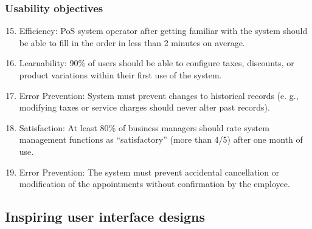 \documentclass{article}
\begin{document}
\subsubsection{Usability objectives}
\begin{enumerate}[label=UO\arabic*.]
\setcounter{enumi}{14}
    \item Efficiency: PoS system operator after getting familiar with the system should be able to fill in the order in less than 2 minutes on average.
    \item Learnability: 90\% of users should be able to configure taxes, discounts, or product variations within their first use of the system.
    \item Error Prevention: System must prevent changes to historical records (e. g., modifying taxes or service charges should never alter past records).
    \item Satisfaction: At least 80\% of business managers should rate system management functions as “satisfactory” (more than 4/5) after one month of use.
    \item Error Prevention: The system must prevent accidental cancellation or modification of the appointments without confirmation by the employee.
\end{enumerate}


\subsection{Inspiring user interface designs}
\end{document}
